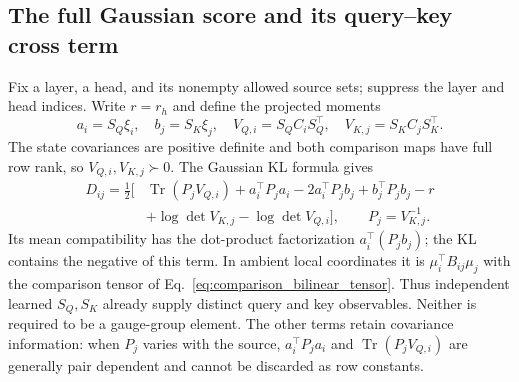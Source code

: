 \documentclass[twoside,11pt]{article}
\begin{document}
\subsection{The full Gaussian score and its query--key cross term}
\label{sec:dot_product_derivation}

Fix a layer, a head, and its nonempty allowed source sets; suppress the layer and head indices. Write $r=r_h$ and define the projected moments
\begin{equation}
a_i=S_Q\xi_i,\quad b_j=S_K\xi_j,\quad
V_{Q,i}=S_QC_iS_Q^\top,\quad V_{K,j}=S_KC_jS_K^\top.
\label{eq:projected_qk_moments}
\end{equation}
The state covariances are positive definite and both comparison maps have full row rank, so $V_{Q,i},V_{K,j}\succ0$. The Gaussian KL formula gives
\begin{align}
D_{ij}=\frac12\bigl[&\operatorname{Tr}(P_jV_{Q,i})
+a_i^\top P_ja_i-2a_i^\top P_jb_j+b_j^\top P_jb_j-r\nonumber\\
&+\log\det V_{K,j}-\log\det V_{Q,i}\bigr],
\qquad P_j=V_{K,j}^{-1}.
\label{eq:projected_full_kl}
\end{align}
Its mean compatibility has the dot-product factorization $a_i^\top(P_jb_j)$; the KL contains the negative of this term. In ambient local coordinates it is $\mu_i^\top B_{ij}\mu_j$ with the comparison tensor of Eq.~\eqref{eq:comparison_bilinear_tensor}. Thus independent learned $S_Q,S_K$ already supply distinct query and key observables. Neither is required to be a gauge-group element. The other terms retain covariance information: when $P_j$ varies with the source, $a_i^\top P_ja_i$ and $\operatorname{Tr}(P_jV_{Q,i})$ are generally pair dependent and cannot be discarded as row constants.
\end{document}

